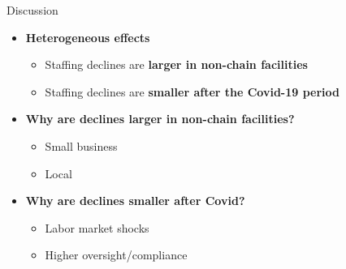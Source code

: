 \documentclass{beamer}
\begin{document}
\begin{frame}[t]{Discussion}

\small
\begin{itemize}
	\item \textbf{Heterogeneous effects}
	
	\begin{itemize}
		\item Staffing declines are \textbf{larger in non-chain facilities}
		\item Staffing declines are \textbf{smaller after the Covid-19 period}
	\end{itemize}

	\pause
	\vspace{0.35em}
	\item \textbf{Why are declines larger in non-chain facilities?}
	
	\begin{itemize}
		\item Small business
		\item Local
	\end{itemize}
	
	\pause
	\vspace{0.35em}
	\item \textbf{Why are declines smaller after Covid?}
	
	\begin{itemize}
		\item Labor market shocks
		\item Higher oversight/compliance
	\end{itemize}

\end{itemize}
\end{frame}



	
\end{document}
